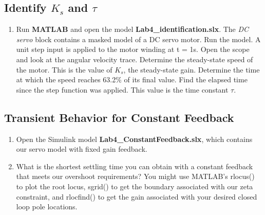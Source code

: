 \documentclass[11pt,a4paper]{article}
\begin{document}
\subsection{Identify $K_{s}$ and $\tau$}
\begin{enumerate}
\item Run \textbf{MATLAB} and open the model \textbf{Lab4\_identification.slx}. The \textit{DC servo} block contains a masked model of a DC servo motor. Run the model. A unit step input is applied to the motor winding at t = 1s. Open the scope and look at the angular velocity trace. Determine the steady-state speed of the motor. This is the value of $K_{s}$, the steady-state gain. Determine the time at which the speed reaches 63.2\% of its final value. Find the elapsed time since the step function was applied. This value is the time constant $\tau$.
 
\end{enumerate}






\subsection{Transient Behavior for Constant Feedback}
\begin{enumerate}
\item Open the Simulink model \textbf{Lab4\_ConstantFeedback.slx}, which contains our servo model with fixed gain feedback. 

\item What is the shortest settling time you can obtain with a constant feedback that meets our overshoot requirements? You might use MATLAB's rlocus() to plot the root locus, sgrid() to get the boundary associated with our zeta constraint, and rlocfind() to get the gain associated with your desired closed loop pole locations.

\end{enumerate}
\end{document}
